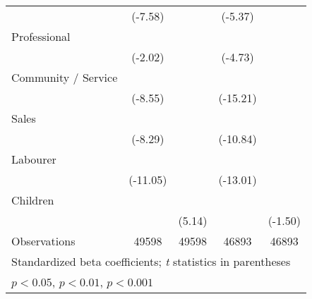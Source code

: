 {\begin{tabular}{l*{4}{c}}
                    &     (-7.58)         &                     &     (-5.37)         &                     \\
[1em]
Professional        &            \sym{*}  &                     &            \sym{***}&                     \\
                    &     (-2.02)         &                     &     (-4.73)         &                     \\
[1em]
Community / Service &            \sym{***}&                     &            \sym{***}&                     \\
                    &     (-8.55)         &                     &    (-15.21)         &                     \\
[1em]
Sales               &            \sym{***}&                     &            \sym{***}&                     \\
                    &     (-8.29)         &                     &    (-10.84)         &                     \\
[1em]
Labourer            &            \sym{***}&                     &            \sym{***}&                     \\
                    &    (-11.05)         &                     &    (-13.01)         &                     \\
[1em]
Children            &                     &            \sym{***}&                     &                     \\
                    &                     &      (5.14)         &                     &     (-1.50)         \\
\hline
Observations        &       49598         &       49598         &       46893         &       46893         \\
\hline\hline
\multicolumn{5}{l}{\footnotesize Standardized beta coefficients; \textit{t} statistics in parentheses}\\
\multicolumn{5}{l}{\footnotesize \sym{*} \(p<0.05\), \sym{**} \(p<0.01\), \sym{***} \(p<0.001\)}\\
\end{tabular}
}
